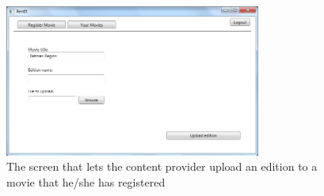 \clearpage

\begin{figure}[h!]
  \centering
    \includegraphics[width=0.75\textwidth]{Parts/Appendix/Images/CPUploadEdition}
  \caption{The screen that lets the content provider upload an edition to a movie that he/she has registered}
  \label{fig:Appendix_GUI_PrototypeCPUpload}
\end{figure}